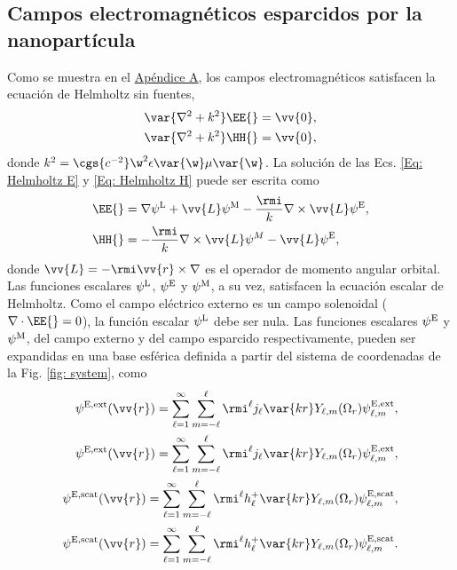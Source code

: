 \subsection{Campos electromagnéticos esparcidos por la nanopartícula}
Como se muestra en el \hyperref[AppendixScalarPotentials]{Apéndice A}, los campos electromagnéticos satisfacen la ecuación de Helmholtz sin fuentes,
\begin{align}
\var{\nabla^2+k^2}\EE{} = \vv{0},\label{Eq: Helmholtz E}\\
\var{\nabla^2+k^2}\HH{} = \vv{0},\label{Eq: Helmholtz H}
\end{align}
donde $k^2 = \cgs{c^{-2}}\w^2\epsilon\var{\w}\mu\var{\w}$. La solución de las Ecs. \eqref{Eq: Helmholtz E} y \eqref{Eq: Helmholtz H} puede ser escrita como \cite{Low}
\begin{align}
\EE{} &= \nabla\psi^{\rm L} + \vv{L}\psi^{\rm M}-\frac{\rmi}{k}\nabla\times\vv{L}\psi^{\rm E}, \label{Eq: E field in terms of potentials}\\
\HH{} &= -\frac{\rmi}{k}\nabla\times\vv{L}\psi^{M}-\vv{L}\psi^{\rm E}, \label{Eq: H field in terms of potentials}
\end{align}
donde $\vv{L}=-\rmi \vv{r}\times\nabla$ es el operador de momento angular orbital. Las funciones escalares $\psi^{\rm L}$, $\psi^{\rm E}$ y $\psi^{\rm M}$, a su vez, satisfacen la ecuación escalar de Helmholtz. Como el campo eléctrico externo es un campo solenoidal ($\nabla\cdot\EE{}=0$), la función escalar $\psi^{\rm L}$ debe ser nula. Las funciones escalares $\psi^{\rm E}$ y $\psi^{\rm M}$, del campo externo y del campo esparcido respectivamente, pueden ser expandidas en una base esférica definida a partir del sistema de coordenadas de la Fig. \ref{fig: system}, como \cite{de1999relativistic}
\begin{align}
\psi^{\rm E, \text{ext}}(\vv{r})=\sum_{\ell =1}^{\infty}\sum_{m=-\ell}^{\ell}\rmi^{\ell}j_{\ell}\var{kr}Y_{\ell, m}(\Omega_r)\psi_{\ell, m}^{\rm E, \text{ext}},\\
\psi^{\rm E, \text{ext}}(\vv{r})=\sum_{\ell =1}^{\infty}\sum_{m=-\ell}^{\ell}\rmi^{\ell}j_{\ell}\var{kr}Y_{\ell, m}(\Omega_r)\psi_{\ell, m}^{\rm E, \text{ext}},\\
\psi^{\rm E, \text{scat}}(\vv{r})=\sum_{\ell =1}^{\infty}\sum_{m=-\ell}^{\ell}\rmi^{\ell}h_{\ell}^{+}\var{kr}Y_{\ell, m}(\Omega_r)\psi_{\ell, m}^{\rm E, \text{scat}},\\
\psi^{\rm E, \text{scat}}(\vv{r})=\sum_{\ell =1}^{\infty}\sum_{m=-\ell}^{\ell}\rmi^{\ell}h_{\ell}^{+}\var{kr}Y_{\ell, m}(\Omega_r)\psi_{\ell, m}^{\rm E, \text{scat}}.
\end{align}
